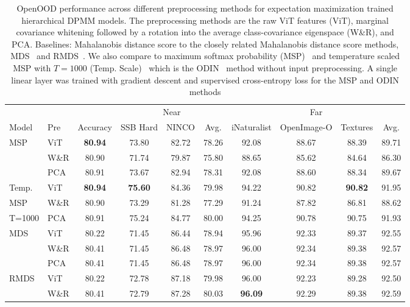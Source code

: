 \begin{table}[!h]
\caption{OpenOOD performance across different preprocessing methods for expectation maximization trained hierarchical DPMM models. The preprocessing methods are the raw ViT features (ViT), marginal covariance whitening followed by a rotation into the average class-covariance eigenspace (W\&R), and PCA. Baselines: Mahalanobis distance score to the closely related Mahalanobis distance score methods, MDS~\citep{lee18mds} and RMDS~\citep{ren21rmds}. We also compare to maximum softmax probability (MSP)~\citep{HendrycksD17} and temperature scaled MSP with $T=1000$ (Temp. Scale)~\citep{guo17tempscale} which is the ODIN~\citep{LiangS18} method without input preprocessing. A single linear layer was trained with gradient descent and supervised cross-entropy loss for the MSP and ODIN methods}
\begin{small}
\begin{center}
\begin{tabular}{llcccccccc}
\toprule
& & & \multicolumn{3}{c}{Near} & \multicolumn{4}{c}{Far} \\
\cmidrule(lr){4-6}\cmidrule(lr){7-10}
Model & Pre  & Accuracy & SSB Hard & NINCO & Avg. & iNaturalist & OpenImage-O & Textures & Avg. \\
\midrule
MSP & ViT & \textbf{80.94} & 73.80 & 82.72 & 78.26 & 92.08 & 88.67 & 88.39 & 89.71 \\
    & W\&R & 80.90 & 71.74 & 79.87 & 75.80 & 88.65 & 85.62 & 84.64 & 86.30 \\
    & PCA & 80.91 & 73.67 & 82.94 & 78.31 & 92.08 & 88.60 & 88.34 & 89.67 \\
\midrule
Temp.   & ViT & \textbf{80.94} & \textbf{75.60} & 84.36 & 79.98 & 94.22 & 90.82 & \textbf{90.82} & 91.95 \\
MSP     & W\&R & 80.90 & 73.29 & 81.28 & 77.29 & 91.24 & 87.82 & 86.81 & 88.62 \\
T=1000  & PCA & 80.91 & 75.24 & 84.77 & 80.00 & 94.25 & 90.78 & 90.75 & 91.93 \\
\midrule
MDS & ViT & 80.22 & 71.45 & 86.44 & 78.94 & 95.96 & 92.33 & 89.37 & 92.55 \\
    & W\&R & 80.41 & 71.45 & 86.48 & 78.97 & 96.00 & 92.34 & 89.38 & 92.57 \\
    & PCA & 80.41 & 71.45 & 86.48 & 78.97 & 96.00 & 92.34 & 89.38 & 92.57 \\
\midrule
RMDS & ViT & 80.22 & 72.78 & 87.18 & 79.98 & 96.00 & 92.23 & 89.28 & 92.50 \\
     & W\&R & 80.41 & 72.79 & 87.28 & 80.03 & \textbf{96.09} & 92.29 & 89.38 & 92.59 \\

\end{tabular}
\end{center}
\end{small}
\end{table}
